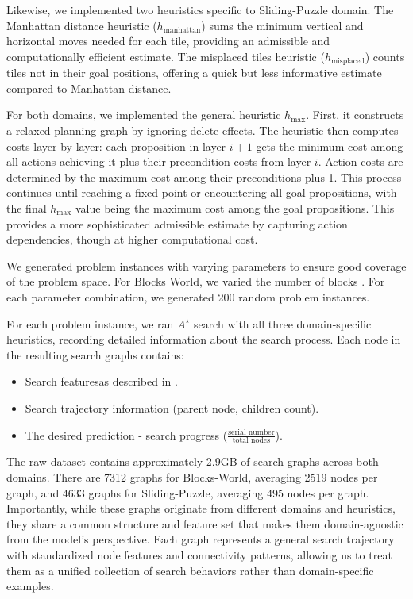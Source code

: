 \documentclass[letterpaper]{article}
\newcommand{\gur}[1]{{\color{teal}{Gur: #1}}}
\begin{document}
Likewise, we implemented two heuristics specific to Sliding-Puzzle domain. The Manhattan distance heuristic ($h_{\text{manhattan}}$) sums the minimum vertical and horizontal moves needed for each tile, providing an admissible and computationally efficient estimate. The misplaced tiles heuristic ($h_{\text{misplaced}}$) counts tiles not in their goal positions, offering a quick but less informative estimate compared to Manhattan distance.

For both domains, we implemented the general heuristic $h_{\max}$. First, it constructs a relaxed planning graph by ignoring delete effects. The heuristic then computes costs layer by layer: each proposition in layer $i+1$ gets the minimum cost among all actions achieving it plus their precondition costs from layer $i$. Action costs are determined by the maximum cost among their preconditions plus 1. This process continues until reaching a fixed point or encountering all goal propositions, with the final $h_{\max}$ value being the maximum cost among the goal propositions. This provides a more sophisticated admissible estimate by capturing action dependencies, though at higher computational cost.

We generated problem instances with varying parameters to ensure good coverage of the problem space. For Blocks World, we varied the number of blocks \gur{(5-10), number of stacks (3-5), and solution depth (7-15 moves). For Sliding Puzzles, we generated boards of different sizes (5x5 to 9x9) with varying solution depths (7-15 moves)}. For each parameter combination, we generated 200 random problem instances.

For each problem instance, we ran $A^{\star}$ search with all three domain-specific heuristics, recording detailed information about the search process. Each node in the resulting search graphs contains:
\begin{itemize}
    \item Search featuresas described in .
    \item Search trajectory information (parent node, children count).
    \item The desired prediction - search progress ($\frac{\text{serial number}}{\text{total nodes}}$).
\end{itemize}

The raw dataset contains approximately 2.9GB of search graphs across both domains. There are 7312 graphs for Blocks-World, averaging 2519 nodes per graph, and 4633 graphs for Sliding-Puzzle, averaging 495 nodes per graph. Importantly, while these graphs originate from different domains and heuristics, they share a common structure and feature set that makes them domain-agnostic from the model's perspective. Each graph represents a general search trajectory with standardized node features and connectivity patterns, allowing us to treat them as a unified collection of search behaviors rather than domain-specific examples.
\end{document}
